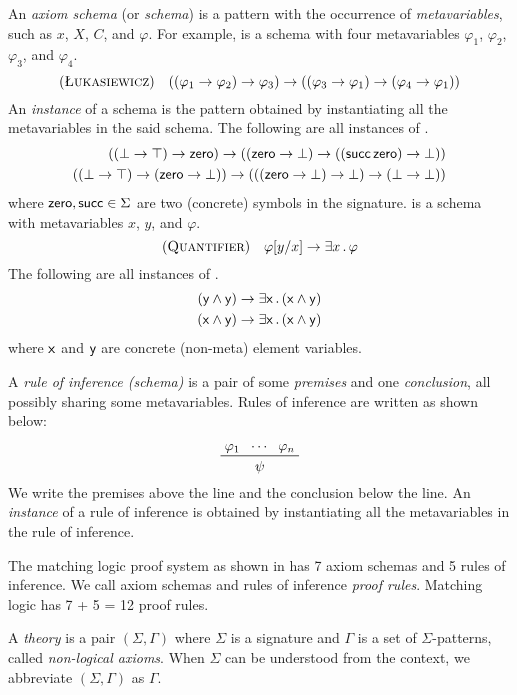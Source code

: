 \documentclass{article}
\begin{document}
An \emph{axiom schema} (or \emph{schema}) is 
a pattern with the occurrence of \emph{metavariables}, such as $x$, $X$, $C$, and $\varphi$.
For example, 
\pruleLuk
is a schema with four metavariables
$\varphi_1$, $\varphi_2$, $\varphi_3$, and $\varphi_4$.
\[
\pruleLuk
\quad
((\varphi_1 \imp \varphi_2) \imp \varphi_3) 
   \imp ((\varphi_3 \imp \varphi_1) \imp (\varphi_4 \imp \varphi_1))
\]
An \emph{instance} of a schema is the pattern obtained by
instantiating all the metavariables in the said schema. 
The following are all instances of \pruleLuk.
\begin{align*}
((\bot \imp \top) \imp \nlzero) 
   \imp ((\nlzero \imp \bot) \imp ((\nlsucc \, \nlzero) \imp \bot))
\\
((\bot \imp \top) \imp (\nlzero \imp \bot)) 
   \imp (((\nlzero \imp \bot) \imp \bot) \imp (\bot \imp \bot))
\end{align*}
where $\nlzero,\nlsucc \in \Sigma$ are two (concrete) symbols in the signature. 
\pruleQ is a schema with metavariables $x$, $y$, and $\varphi$. 
\[
\pruleQ \quad \varphi[y/x] \imp \exists x \ld \varphi
\]
The following are all instances of \pruleQ.
\begin{align*}
(\cvy \land \cvy) \imp \exists \cvx \ld (\cvx \land \cvy)
\\
(\cvx \land \cvy) \imp \exists \cvx \ld (\cvx \land \cvy)
\end{align*}
where $\cvx$ and $\cvy$ are concrete (non-meta) element variables. 

A \emph{rule of inference (schema)} is a pair of
some \emph{premises} and one \emph{conclusion},
all possibly sharing some metavariables.
Rules of inference are written as shown below:
\[
\prftree{\varphi_1}{\cdots}{\varphi_n}{\psi}
\]
We write the premises above the line and the conclusion below the line. 
An \emph{instance} of a rule of inference is obtained by
instantiating all the metavariables in the rule of inference. 

The matching logic proof system as shown in 
has 7 axiom schemas and 5 rules of inference. 
We call axiom schemas and rules of inference \emph{proof rules}.
Matching logic has 7 + 5 = 12 proof rules. 

\begin{definition}
A \emph{theory} is a pair $(\Sigma,\Gamma)$
where $\Sigma$ is a signature and $\Gamma$ is a set of $\Sigma$-patterns, 
called \emph{non-logical axioms}. 
When $\Sigma$ can be understood from the context,
we abbreviate $(\Sigma, \Gamma)$ as $\Gamma$. 
\end{definition}
\end{document}
